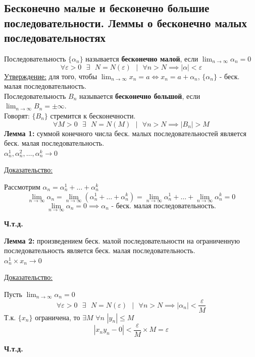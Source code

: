 \documentclass[12pt]{article}
\begin{document}
    \subsection{Бесконечно малые и бесконечно большие последовательности. Леммы о бесконечно малых последовательностях}\noindent
    Последовательность $\{\alpha_n\}$ называется \textbf{бесконечно малой}, если $\lim_{n\to\infty} \alpha_n = 0$
    \[\forall \varepsilon > 0 \text{ } \exists \text{ } N = N(\varepsilon) \text{ } \big| \text{ } \forall n > N \implies |\alpha| < \varepsilon\]
    \underline{Утверждение:} для того, чтобы $\lim_{n\to\infty} x_n = a \Longleftrightarrow x_n = a + \alpha_n$, $\{\alpha_n\}$ - беск. малая последовательность.\\
    Последовательность $B_n$ называется \textbf{бесконечно большой}, если $\lim_{n\to\infty} B_n = \pm\infty$.\\
    Говорят: $\{B_n\}$ стремится к бесконечности.
    \[\forall M > 0 \text{ } \exists \text{ } N = N(M) \text{ } \big| \text{ } \forall n > N \implies |B_n| > M\]
    \textbf{Лемма 1:} суммой конечного числа беск. малых последовательностей является беск. малая последовательность.\\
    $\alpha_n^1, \alpha_n^2, \dots, \alpha_n^k \to 0$\par\noindent
    \underline{Доказательство:}\par
    \begin{adjustwidth}{1.5em}{1.5em}
        Рассмотрим $\alpha_n = \alpha_n^1 + \dots + \alpha_n^k$\\
        \[ \lim_{n\to\infty} \alpha_n = \lim_{n\to\infty}(\alpha_n^1 + \dots + \alpha_n^k) = \lim_{n\to\infty}\alpha_n^1 + \dots + \lim_{n\to\infty}\alpha_n^k = 0 \]
        \[ \lim_{n\to\infty} \alpha_n = 0 \implies \alpha_n \text{ - беск. малая последовательность.} \]
        \begin{center}
            \textbf{Ч.т.д.}
        \end{center}
    \end{adjustwidth}
    \textbf{Лемма 2:} произведением беск. малой последовательности на ограниченную последовательность является беск. малая последовательность.\\
    $\alpha_n^1 \times x_n \to 0$\par\noindent
    \underline{Доказательство:}
    \begin{adjustwidth}{1.5em}{1.5em}
        Пусть $\lim_{n\to\infty}\alpha_n = 0$
        \[ \forall \varepsilon > 0 \text{ } \exists \text{ } N = N(\varepsilon) \text{ } \big| \text{ } \forall n > N \implies |\alpha_{n}| < \frac{\varepsilon}{M} \]
        Т.к. $\{x_n\}$ ограничена, то $\exists M$ $\forall n$ $|y_n| \le M$
        \[ |x_ny_n - 0| < \frac{\varepsilon}{M} \times M = \varepsilon \]
        \begin{center}
            \textbf{Ч.т.д.}
        \end{center}
    \end{adjustwidth}
\end{document}
